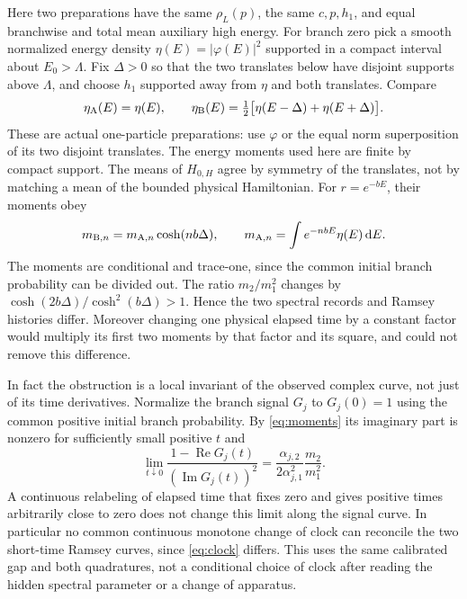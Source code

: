 \documentclass[11pt]{article}
\newcommand{\dd}{\mathrm d}
\begin{document}
Here two preparations have the same \(\rho_L(p)\), the same \(c,p,h_1\), and equal branchwise and total mean auxiliary high energy. For branch zero pick a smooth normalized energy density \(\eta(E)=|\varphi(E)|^2\) supported in a compact interval about \(E_0>\Lambda\). Fix \(\Delta>0\) so that the two translates below have disjoint supports above \(\Lambda\), and choose \(h_1\) supported away from \(\eta\) and both translates. Compare
\[
 \eta_{\rm A}(E)=\eta(E),\qquad
 \eta_{\rm B}(E)=\tfrac12\bigl[\eta(E-\Delta)+\eta(E+\Delta)\bigr].
\]
These are actual one-particle preparations: use \(\varphi\) or the equal norm superposition of its two disjoint translates. The energy moments used here are finite by compact support. The means of \(H_{0,H}\) agree by symmetry of the translates, not by matching a mean of the bounded physical Hamiltonian. For \(r=e^{-bE}\), their moments obey
\[
 m_{{\rm B},n}=m_{{\rm A},n}\cosh(nb\Delta),\qquad
 m_{{\rm A},n}=\int e^{-nbE}\eta(E)\,\dd E .
\]
The moments are conditional and trace-one, since the common initial branch probability can be divided out. The ratio \(m_2/m_1^2\) changes by
\(\cosh(2b\Delta)/\cosh^2(b\Delta)>1\). Hence the two spectral records and Ramsey histories differ. Moreover changing one physical elapsed time by a constant factor would multiply its first two moments by that factor and its square, and could not remove this difference.

In fact the obstruction is a local invariant of the observed complex curve, not just of its time derivatives. Normalize the branch signal \(G_j\) to \(G_j(0)=1\) using the common positive initial branch probability. By \eqref{eq:moments} its imaginary part is nonzero for sufficiently small positive \(t\) and
\begin{equation}
 \lim_{t\downarrow 0}
 \frac{1-\operatorname{Re}G_j(t)}
      {(\operatorname{Im}G_j(t))^2}
 =\frac{\alpha_{j,2}}{2\alpha_{j,1}^2}\frac{m_2}{m_1^2}.
 \label{eq:clock}
\end{equation}
A continuous relabeling of elapsed time that fixes zero and gives positive times arbitrarily close to zero does not change this limit along the signal curve. In particular no common continuous monotone change of clock can reconcile the two short-time Ramsey curves, since \eqref{eq:clock} differs. This uses the same calibrated gap and both quadratures, not a conditional choice of clock after reading the hidden spectral parameter or a change of apparatus.
\end{document}
